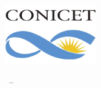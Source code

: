 \frenchspacing
\raggedbottom
{}
\pagestyle{plain}
\setlength{\abovedisplayskip}{0pt}  
\setlength{\abovedisplayshortskip}{0pt}
\begin{titlepage}
\begin{addmargin}[-10mm]{-30mm}  %
\large

\vspace*{\fill}

\begin{center}
\begingroup 
\color{CTtitle} 
\\
\vspace{12pt}
\endgroup\\
\bigskip{}
\spacedlowsmallcaps{\Large\myName}\\
\vfill{}
\par\end{center}

\begin{center}
\includegraphics[width=4cm]{config/CONICET.jpg}\\
\medskip{}
\par\end{center}

\begin{center}
\mySubtitle
\par\end{center}

\medskip{}

\begin{center}
\myTime\ –\ \myVersion
\par\end{center}

\vfill{}

\end{addmargin} 
\end{titlepage} 

\pagestyle{scrheadings}

